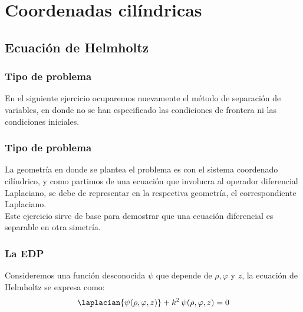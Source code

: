 \section{Coordenadas cilíndricas}
\subsection{Ecuación de Helmholtz}
\begin{frame}
\frametitle{Tipo de problema}
En el siguiente ejercicio ocuparemos nuevamente el método de separación de variables, en donde no se han especificado las condiciones de frontera ni las condiciones iniciales.
\end{frame}
\begin{frame}
\frametitle{Tipo de problema}
La geometría en donde se plantea el problema es con el sistema coordenado cilíndrico, y como partimos de una ecuación que involucra al operador diferencial Laplaciano, se debe de representar en la respectiva geometría, el correspondiente Laplaciano.
\\
\bigskip
Este ejercicio sirve de base para demostrar que una ecuación diferencial es separable en otra simetría.
\end{frame}
\begin{frame}
\frametitle{La EDP}
Consideremos una función desconocida $\psi$ que depende de $\rho, \varphi$ y $z$, la ecuación de Helmholtz se expresa como:
\begin{align}
\laplacian{\psi (\rho, \varphi, z)} + k^{2} \, \psi (\rho, \varphi, z) = 0
\label{eq:ecuacion_09_45}    
\end{align}
\end{frame}

